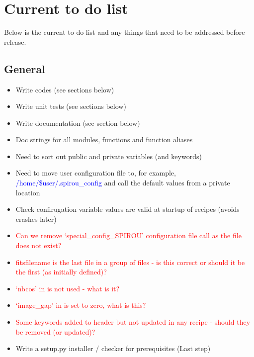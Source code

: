 \chapter{Current to do list}
\label{ch:todo}

Below is the current to do list and any things that need to be addressed before release.

\section{General}
\label{ch:todo:general}

\begin{itemize}
	\item Write codes (see sections below)
	\item Write unit tests (see sections below)
	\item Write documentation (see section below)
	\item Doc strings for all modules, functions and function aliases
	\item Need to sort out public and private variables (and keywords)
	\item Need to move user configuration file to, for example, \textcolor{blue}{/home/\$user/.spirou\_config} and call the default values from a private location
	\item Check confirugation variable values are valid at startup of recipes (avoids crashes later)
	\item \textcolor{red}{Can we remove `special\_config\_SPIROU' configuration file call as the file does not exist?}
	\item \textcolor{red}{fitsfilename is the last file in a group of files - is this correct or should it be the first (as initially defined)?}
	\item \textcolor{red}{`nbcos' in  is not used - what is it?}
	\item \textcolor{red}{`image\_gap' in  is set to zero, what is this?}
	\item \textcolor{red}{Some keywords added to header but not updated in any recipe - should they be removed (or updated)?}
	\item Write a setup.py installer / checker for prerequisites (Last step)
\end{itemize}

